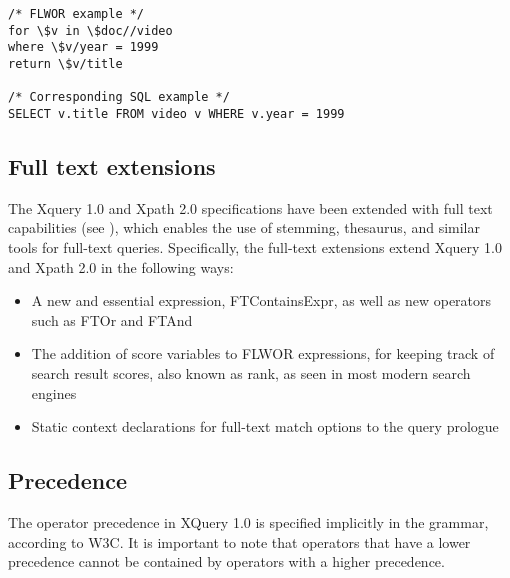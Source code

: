 \begin{verbatim}
/* FLWOR example */
for \$v in \$doc//video
where \$v/year = 1999
return \$v/title

/* Corresponding SQL example */
SELECT v.title FROM video v WHERE v.year = 1999
\end{verbatim}

\subsection{Full text extensions}
The Xquery 1.0  and Xpath 2.0 specifications have been extended with full text capabilities (see \cite{w3c02}), which enables the use of stemming, thesaurus, and similar tools for full-text queries. Specifically, the full-text extensions extend Xquery 1.0 and Xpath 2.0 in the following ways:
\begin{itemize}
\item A new and essential expression, FTContainsExpr, as well as new operators such as FTOr and FTAnd
\item The addition of score variables to FLWOR expressions, for keeping track of search result scores, also known as rank, as seen in most modern search engines
\item Static context declarations for full-text match options to the query prologue
\end{itemize}

\subsection{Precedence}
\label{sect:xquery:precedence}
The operator precedence in XQuery 1.0 is specified implicitly in the grammar,
according to W3C\cite{w3cprecedence}. It is important to note that operators that 
have a lower precedence cannot be contained by operators with a higher 
precedence.
